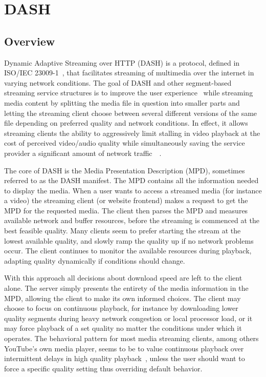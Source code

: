 \section{DASH}

\subsection{Overview}

Dynamic Adaptive Streaming over HTTP (DASH) is a protocol, defined in
ISO/IEC 23009-1~\cite{iso-dash-2014}, that facilitates 
streaming of multimedia over the internet in varying network conditions.
The goal of DASH and other segment-based streaming service structures is to improve the user
experience~\cite{Google I/O 2013} while streaming media content by splitting the media file in question
into smaller parts and letting the streaming client choose between several
different versions of the same file depending on preferred quality and network
conditions. In effect, it allows streaming clients the ability to aggressively
limit stalling in video playback at the cost of perceived video/audio quality
while simultaneously saving the service provider a significant amount of
network traffic~\cite[p. 412]{dashing-youtube}~\cite{Google I/O 2013}.

The core of DASH is the Media Presentation Description (MPD), sometimes
referred to as the DASH manifest. The MPD contains all the information
needed to display the media. When a user wants to access a streamed
media (for instance a video) the streaming client (or website frontend)
makes a request to get the MPD for the requested media. The client then
parses the MPD and measures available network and buffer resources,
before the streaming is commenced at the best feasible quality. Many clients %
seem to prefer starting the stream at the lowest available quality, and
slowly ramp the quality up if no network problems occur. The
client continues to monitor the available resources during playback, adapting
quality dynamically if conditions should change.

With this approach all decisions about download speed are left to the client
alone.
The server simply presents the entirety of the media information in the MPD,
allowing the client to make its own informed choices. The client may choose
to focus on continuous playback, for instance by downloading lower quality
segments during heavy network congestion or local processor load, or it may
force playback of a set quality no matter the conditions under which it
operates. The behavioral pattern for most media streaming clients, among
others YouTube's own media player, seems to be to value continuous playback
over intermittent delays in high quality playback~\cite{Google I/O 2013}, unless the user should want
to force a specific quality setting thus overriding default behavior.

